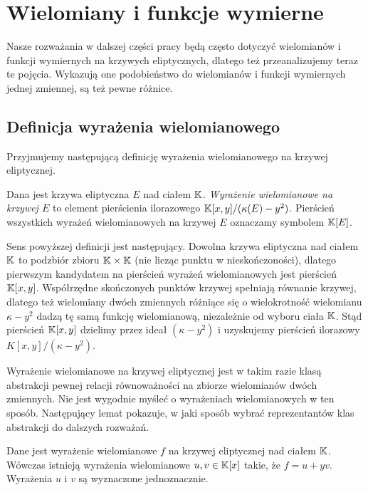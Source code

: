 \section{Wielomiany i funkcje wymierne}

\noindent
Nasze rozważania w dalszej części pracy
będą często dotyczyć
wielomianów i funkcji wymiernych na krzywych eliptycznych,
dlatego też przeanalizujemy teraz te pojęcia.
Wykazują one podobieństwo do wielomianów i funkcji wymiernych jednej zmiennej,
są też pewne różnice.

\subsection*{Definicja wyrażenia wielomianowego}

\noindent
Przyjmujemy następującą definicję
wyrażenia wielomianowego na krzywej eliptycznej.

\begin{definition}
Dana jest krzywa eliptyczna $E$ nad ciałem $\mathbb{K}$.
\emph{Wyrażenie wielomianowe na krzywej $E$}
to element pierścienia ilorazowego
$\mathbb{K}[x,y]/(\kappa(E) - y^2)$.
Pierścień wszystkich wyrażeń wielomianowych na krzywej $E$
oznaczamy symbolem $\mathbb{K}[E]$.
\end{definition}

\noindent
Sens powyższej definicji jest następujący.
Dowolna krzywa eliptyczna nad ciałem $\mathbb{K}$ to podzbiór zbioru $\mathbb{K} \times \mathbb{K}$
(nie licząc punktu w nieskończoności),
dlatego pierwszym kandydatem na pierścień wyrażeń wielomianowych
jest pierścień $\mathbb{K}[x,y]$.
Współrzędne skończonych punktów krzywej spełniają równanie krzywej,
dlatego też wielomiany dwóch zmiennych różniące się
o wielokrotność wielomianu $\kappa- y^2$
dadzą tę samą funkcję wielomianową,
niezależnie od wyboru ciała $\mathbb{K}$.
Stąd pierścień $\mathbb{K}[x,y]$ dzielimy przez ideał $(\kappa- y^2)$
i uzyskujemy pierścień ilorazowy $K[x,y]/(\kappa - y^2)$.

\noindent
Wyrażenie wielomianowe na krzywej eliptycznej
jest w takim razie klasą abstrakcji
pewnej relacji równoważności na zbiorze wielomianów dwóch zmiennych.
Nie jest wygodnie myśleć o wyrażeniach wielomianowych w ten sposób.
Następujący lemat pokazuje,
w jaki sposób wybrać reprezentantów klas abstrakcji
do dalszych rozważań.

\begin{theorem}
Dane jest wyrażenie wielomianowe $f$ na krzywej eliptycznej nad ciałem $\mathbb{K}$.
Wówczas istnieją wyrażenia wielomianowe $u, v \in \mathbb{K}[x]$ takie,
że $f = u + yv$.
Wyrażenia $u$ i $v$ są wyznaczone jednoznacznie.
\end{theorem}

